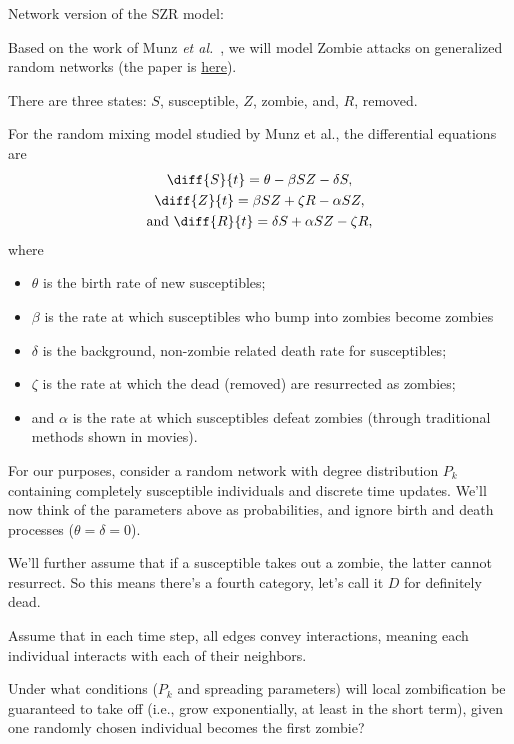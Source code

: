 \begin{enumerate}
  
  Network version of the SZR model:

  Based on the work of Munz \textit{et al.}~\cite{munz2009a},
  we will model Zombie attacks on generalized random networks
  (the paper is \href{http://www.uvm.edu/~pdodds/research/papers/others/2009/munz2009a.pdf}{here}).

  There are three states: $S$, susceptible, $Z$, zombie, and, $R$, removed.

  For the random mixing model studied by Munz et al., the differential equations are
  \begin{gather}
    \diff{S}{t} = \theta - \beta S Z - \delta S, \nonumber \\
    \diff{Z}{t} = \beta S Z + \zeta R - \alpha S Z, \nonumber \\
    \mbox{and} \ \diff{R}{t} = \delta S + \alpha S Z - \zeta R, \nonumber 
  \end{gather}
  where
  \begin{itemize}
  \item[] 
    $\theta$ is the birth rate of new susceptibles;
  \item[] 
    $\beta$ is the rate at which susceptibles who bump
    into zombies become zombies
  \item[] 
    $\delta$ is the background, non-zombie related death rate for susceptibles;
  \item[] 
    $\zeta$ is the rate at which the dead (removed) are resurrected as zombies;
  \item[] 
    and $\alpha$ is the rate at which susceptibles defeat zombies (through
    traditional methods shown in movies).
  \end{itemize}

  For our purposes, consider a random network with degree distribution $P_{k}$
  containing completely susceptible individuals
  and discrete time updates.  We'll now think of the parameters above
  as probabilities, and ignore birth and death processes ($\theta  = \delta = 0$).

  We'll further assume that if a susceptible takes out a zombie, the latter
  cannot resurrect.  So this means there's a fourth category, let's call
  it $D$ for definitely dead.

  Assume that in each time step, all edges convey interactions,
  meaning each individual interacts with each of their neighbors.

  Under what conditions ($P_{k}$ and spreading parameters)
  will local zombification be guaranteed to take off (i.e., grow exponentially,
  at least in the short term),
  given one randomly chosen individual becomes the first zombie?


\end{enumerate}
